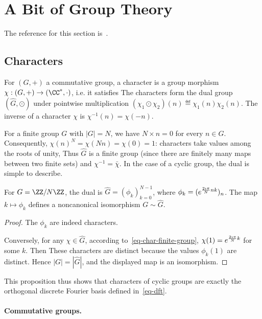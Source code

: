 \section{A Bit of Group Theory}

The reference for this section is~\cite{peyre2004algebre}.

\subsection{Characters}

For $(G,+)$ a commutative group, a character is a group morphism $\chi : (G,+) \rightarrow (\CC^*,\cdot)$, i.e. it satisfies
The characters form the dual group $(\hat G,\odot)$ under pointwise multiplication $(\chi_1 \odot \chi_2)(n) \eqdef \chi_1(n) \chi_2(n)$. The inverse of a character $\chi$ is $\chi^{-1}(n)=\chi(-n)$.

For a finite group $G$ with $|G|=N$, we have $N \times n=0$ for every $n \in G$. Consequently, $\chi(n)^N=\chi(N n)=\chi(0)=1$: characters take values among the roots of unity,
Thus $\hat G$ is a finite group (since there are finitely many maps between two finite sets) and $\chi^{-1}=\bar\chi$. In the case of a cyclic group, the dual is simple to describe.

\begin{prop}\label{prop-iso-cyclic}
	For $G=\ZZ/N\ZZ$, the dual is $\hat G=( \phi_k )_{k=0}^{N-1}$, where $\phi_k=( e^{\frac{2\imath\pi}{N} nk} )_n$. The map $k \mapsto \phi_k$ defines a noncanonical isomorphism $G \sim \hat G$.
\end{prop}
\begin{proof}
	The $\phi_k$ are indeed characters.
	
	Conversely, for any $\chi \in \hat G$, according to~\eqref{eq-char-finite-group}, $\chi(1)=e^{\frac{2\imath\pi}{N} k}$ for some $k$. Then 
	These characters are distinct because the values $\phi_k(1)$ are distinct. Hence $|G|=|\hat G|$, and the displayed map is an isomorphism.
\end{proof}

This proposition thus shows that characters of cyclic groups are exactly the orthogonal discrete Fourier basis defined in~\eqref{eq-dft}.


\paragraph{Commutative groups.}

